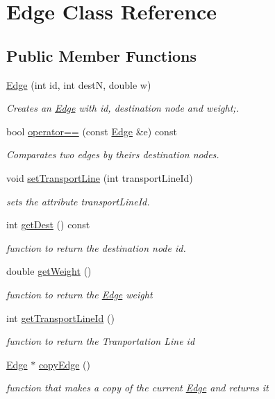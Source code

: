 \hypertarget{class_edge}{}\section{Edge Class Reference}
\label{class_edge}
\subsection*{Public Member Functions}
\begin{DoxyCompactItemize}
\item 
\hyperlink{class_edge_aab13f63958d70bd9c71da69229088b4c}{Edge} (int id, int destN, double w)
\begin{DoxyCompactList}\small\item\em Creates an \hyperlink{class_edge}{Edge} with id, destination node and weight;. \end{DoxyCompactList}\item 
bool \hyperlink{class_edge_a38c76499b14c3ada34f0b485f6e2a5bb}{operator==} (const \hyperlink{class_edge}{Edge} \&e) const
\begin{DoxyCompactList}\small\item\em Comparates two edges by theirs destination nodes. \end{DoxyCompactList}\item 
void \hyperlink{class_edge_ad22476bee43fa688e83428d47979faf1}{set\+Transport\+Line} (int transport\+Line\+Id)
\begin{DoxyCompactList}\small\item\em sets the attribute transport\+Line\+Id. \end{DoxyCompactList}\item 
int \hyperlink{class_edge_abaec2509b4b51681298960b180b06e25}{get\+Dest} () const
\begin{DoxyCompactList}\small\item\em function to return the destination node id. \end{DoxyCompactList}\item 
double \hyperlink{class_edge_a3a776c1ccafacdbdb10fdedd9cb329af}{get\+Weight} ()
\begin{DoxyCompactList}\small\item\em function to return the \hyperlink{class_edge}{Edge} weight \end{DoxyCompactList}\item 
int \hyperlink{class_edge_ae7740d633ce6970776aa381cc54fbc18}{get\+Transport\+Line\+Id} ()
\begin{DoxyCompactList}\small\item\em function to return the Tranportation Line id \end{DoxyCompactList}\item 
\hyperlink{class_edge}{Edge} $\ast$ \hyperlink{class_edge_a963d13747c8fe31cdd3bba214b1b8c7d}{copy\+Edge} ()
\begin{DoxyCompactList}\small\item\em function that makes a copy of the current \hyperlink{class_edge}{Edge} and returns it \end{DoxyCompactList}\end{DoxyCompactItemize}
